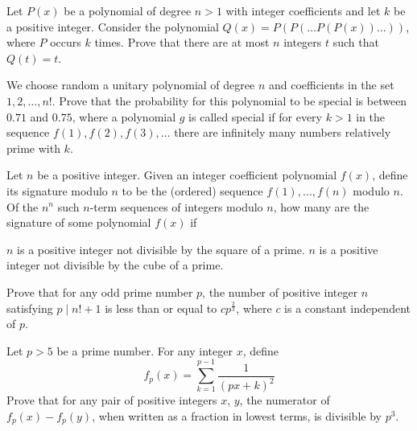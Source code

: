 \documentclass[12pt,a4paper]{memoir}
\theoremstyle{definition}
\begin{document}
\begin{question}[name={2006 IMO}]
	Let $P(x)$ be a polynomial of degree $n > 1$ with integer coefficients and let $k$ be a positive integer. Consider the polynomial $Q(x) = P(P(\ldots P(P(x)) \ldots ))$, where $P$ occurs $k$ times. Prove that there are at most $n$ integers $t$ such that $Q(t) = t$.
\end{question}

\begin{question}[name={2005 USA TST}]
	We choose random a unitary polynomial of degree $n$ and coefficients in the set $1,2,\dots,n!$. Prove that the probability for this polynomial to be special is between $0.71$ and $0.75$, where a polynomial $g$ is called special if for every $k>1$ in the sequence $f(1), f(2), f(3),\dots$ there are infinitely many numbers relatively prime with $k$.
\end{question}

\begin{question}[name={2008 USA TST}]
	Let $ n$ be a positive integer. Given an integer coefficient polynomial $ f(x)$, define its signature modulo $ n$ to be the (ordered) sequence $ f(1), \ldots , f(n)$ modulo $ n$. Of the $ n^n$ such $ n$-term sequences of integers modulo $ n$, how many are the signature of some polynomial $ f(x)$ if
	\begin{tasks}
		\task $ n$ is a positive integer not divisible by the square of a prime.
		\task $ n$ is a positive integer not divisible by the cube of a prime.
	\end{tasks}
\end{question}


\begin{question}[name={2009 China TST}]
	Prove that for any odd prime number $p$, the number of positive integer $n$ satisfying $ p\mid n! + 1$ is less than or equal to $ cp^\frac{2}{3}$, where $c$ is a constant independent of $p.$
\end{question}



\begin{question}[name={2002 USA TST}]
	Let $p>5$ be a prime number. For any integer $x$, define
	\[{f_p}(x) = \sum_{k=1}^{p-1} \frac{1}{(px+k)^2}\]
	Prove that for any pair of positive integers $x$, $y$, the numerator of $f_p(x) - f_p(y)$, when written as a fraction in lowest terms, is divisible by $p^3$.
\end{question}
\end{document}
